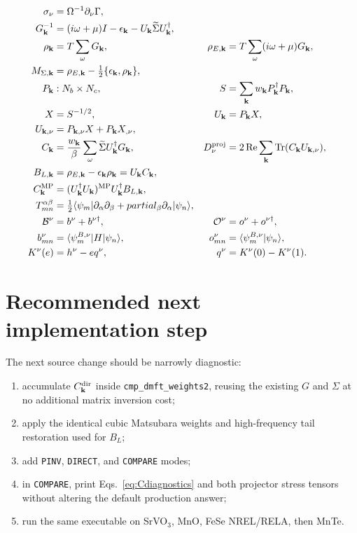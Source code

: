 \documentclass[11pt]{article}
\numberwithin{equation}{section}
\newcommand{\Tr}{\operatorname{Tr}}
\newcommand{\Ree}{\operatorname{Re}}
\newcommand{\kb}{\mathbf k}
\newcommand{\Sig}{\widetilde\Sigma}
\newcommand{\code}[1]{\texttt{#1}}
\begin{document}
\begin{align}
 \sigma_\nu&=\Omega^{-1}\partial_\nu\Gamma,\\
 G_\kb^{-1}&=(i\omega+\mu)I-\epsilon_\kb-U_\kb\Sig U_\kb^\dagger,\\
 \rho_\kb&=T\sum_\omega G_\kb,
 &\rho_{E,\kb}&=T\sum_\omega(i\omega+\mu)G_\kb,\\
 M_{\Sigma,\kb}&=\rho_{E,\kb}-\tfrac12\{\epsilon_\kb,\rho_\kb\},\\
 P_\kb&:N_b\times N_c,
 &S&=\sum_\kb w_\kb P_\kb^\dagger P_\kb,\\
 X&=S^{-1/2},
 &U_\kb&=P_\kb X,\\
 U_{\kb,\nu}&=P_{\kb,\nu}X+P_\kb X_{,\nu},\\
 C_\kb&=\frac{w_\kb}{\beta}\sum_\omega
 \Sig U_\kb^\dagger G_\kb,
 &D_\nu^{\rm proj}&=2\Ree\sum_\kb\Tr(C_\kb U_{\kb,\nu}),\\
 B_{L,\kb}&=\rho_{E,\kb}-\epsilon_\kb\rho_\kb=U_\kb C_\kb,\\
 C_\kb^{\rm MP}&=(U_\kb^\dagger U_\kb)^{\rm MP}
 U_\kb^\dagger B_{L,\kb},\\
 T_{mn}^{\alpha\beta}&=\tfrac12\langle\psi_m|
 \partial_\alpha\partial_\beta+partial_\beta\partial_\alpha|\psi_n\rangle,\\
 \mathcal B^\nu&=b^\nu+b^{\nu\dagger},
 &\mathcal O^\nu&=o^\nu+o^{\nu\dagger},\\
 b_{mn}^\nu&=\langle\psi_m^{B,\nu}|H|\psi_n\rangle,
 &o_{mn}^\nu&=\langle\psi_m^{B,\nu}|\psi_n\rangle,\\
 K^\nu(e)&=h^\nu-eq^\nu,
 &q^\nu&=K^\nu(0)-K^\nu(1).
\end{align}

\section{Recommended next implementation step}

The next source change should be narrowly diagnostic:

\begin{enumerate}
\item accumulate $C_\kb^{\rm dir}$ inside \code{cmp\_dmft\_weights2}, reusing
      the existing $G$ and $\Sigma$ at no additional matrix inversion cost;
\item apply the identical cubic Matsubara weights and high-frequency tail
      restoration used for $B_L$;
\item add \code{PINV}, \code{DIRECT}, and \code{COMPARE} modes;
\item in \code{COMPARE}, print Eqs.~\eqref{eq:Cdiagnostics} and both projector
      stress tensors without altering the default production answer;
\item run the same executable on SrVO$_3$, MnO, FeSe NREL/RELA, then MnTe.
\end{enumerate}
\end{document}
